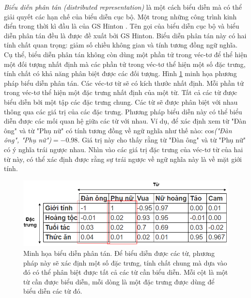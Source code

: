 \textit{Biểu diễn phân tán (distributed representation)} là một cách biểu diễn mà có thể giải quyết các hạn chế của biểu diễn cục bộ. Một trong những công trình kinh điển trong thời kì đầu là của GS Hinton \cite{distributedrepHinton}. Tên gọi của biểu diễn cục bộ và biểu diễn phân tán đều là được đề xuất bởi GS Hinton. Biểu diễn phân tán này có hai tính chất quan trọng: giảm số chiều không gian và tính tương đồng ngữ nghĩa. Cụ thể, biểu diễn phân tán không còn dùng một phần tử trong véc-tơ để thể hiện một đối tượng nhất định mà các phần tử trong véc-tơ thể hiện một số đặc trưng, tính chất có khả năng phân biệt được các đối tượng. Hình \ref{fig_distributed_representation} minh họa phương pháp biểu diễn phân tán. Các véc-tơ từ sẽ có kích thước nhất định. Mỗi phần tử trong véc-tơ thể hiện một đặc trưng nhất định của một từ. Tất cả các từ được biểu diễn bởi một tập các đặc trưng chung. Các từ sẽ được phân biệt với nhau thông qua các giá trị của các đặc trưng. Phương pháp biểu diễn này có thể biểu diễn được các mối quan hệ giữa các từ với nhau. Ví dụ, để xác định xem từ "Đàn ông" và từ "Phụ nữ" có tính tương đồng về ngữ nghĩa như thế nào: cos\textit{("Đàn ông", "Phụ nữ")}$ = -0.98$. Giá trị này cho thấy rằng từ "Đàn ông" và từ "Phụ nữ" có ý nghĩa trái ngược nhau. Nhìn vào các giá trị đặc trưng của véc-tơ từ của hai từ này, có thể xác định được rằng sự trái ngược về ngữ nghĩa này là về mặt giới tính.

\begin{figure}
	\centering
	\includegraphics[width=1.0\textwidth]{distributed-representation_1}
	\caption[Minh họa biểu diễn phân tán]{Minh họa biểu diễn phân tán. Để biểu diễn được các từ, phương pháp này sẽ xác định một số đặc trưng, tính chất chung mà dựa vào đó có thể phân biệt được tất cả các từ cần biểu diễn. Mỗi cột là một từ cần được biểu diễn, mỗi dòng là một đặc trưng được dùng để biểu diễn các từ đó.}
	\label{fig_distributed_representation}
\end{figure}

